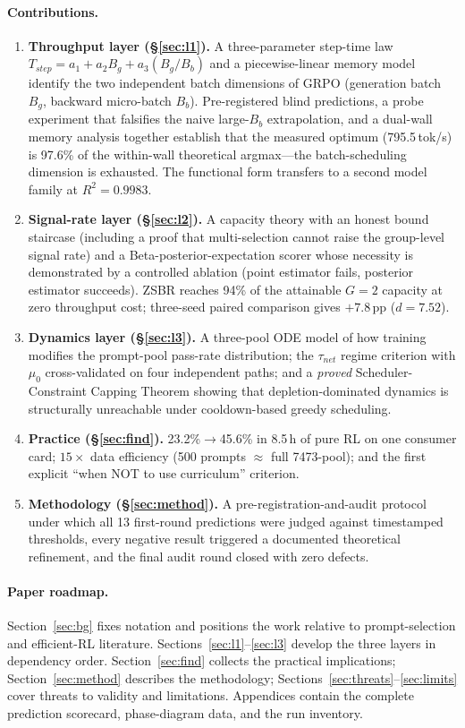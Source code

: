 \documentclass[11pt]{article}
\theoremstyle{definition}
\begin{document}
\paragraph{Contributions.}
\begin{enumerate}[leftmargin=1.5em]
\item \textbf{Throughput layer (\S\ref{sec:l1}).} A three-parameter step-time law
$T_{step}=a_1+a_2 B_g+a_3(B_g/B_b)$ and a piecewise-linear memory model identify
the two independent batch dimensions of GRPO (generation batch $B_g$, backward
micro-batch $B_b$). Pre-registered blind predictions, a probe experiment that
falsifies the naive large-$B_b$ extrapolation, and a dual-wall memory analysis
together establish that the measured optimum (795.5\,tok/s) is 97.6\% of the
within-wall theoretical argmax---the batch-scheduling dimension is exhausted.
The functional form transfers to a second model family at $R^2{=}0.9983$.
\item \textbf{Signal-rate layer (\S\ref{sec:l2}).} A capacity theory with an
honest bound staircase (including a proof that multi-selection cannot raise the
group-level signal rate) and a Beta-posterior-expectation scorer whose necessity
is demonstrated by a controlled ablation (point estimator fails, posterior
estimator succeeds). ZSBR reaches 94\% of the attainable $G{=}2$ capacity at zero
throughput cost; three-seed paired comparison gives $+7.8$\,pp ($d{=}7.52$).
\item \textbf{Dynamics layer (\S\ref{sec:l3}).} A three-pool ODE model of how
training modifies the prompt-pool pass-rate distribution; the $\tau_{net}$ regime
criterion with $\mu_0$ cross-validated on four independent paths; and a
\emph{proved} Scheduler-Constraint Capping Theorem showing that depletion-dominated
dynamics is structurally unreachable under cooldown-based greedy scheduling.
\item \textbf{Practice (\S\ref{sec:find}).} 23.2\%$\to$45.6\% in 8.5\,h of pure RL
on one consumer card; $15\times$ data efficiency (500 prompts $\approx$ full
7473-pool); and the first explicit ``when NOT to use curriculum'' criterion.
\item \textbf{Methodology (\S\ref{sec:method}).} A pre-registration-and-audit
protocol under which all 13 first-round predictions were judged against
timestamped thresholds, every negative result triggered a documented theoretical
refinement, and the final audit round closed with zero defects.
\end{enumerate}

\paragraph{Paper roadmap.} Section~\ref{sec:bg} fixes notation and positions the
work relative to prompt-selection and efficient-RL literature. Sections~\ref{sec:l1}--\ref{sec:l3}
develop the three layers in dependency order. Section~\ref{sec:find} collects the
practical implications; Section~\ref{sec:method} describes the methodology;
Sections~\ref{sec:threats}--\ref{sec:limits} cover threats to validity and
limitations. Appendices contain the complete prediction scorecard, phase-diagram
data, and the run inventory.
\end{document}
